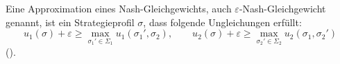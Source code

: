 Eine Approximation eines Nash-Gleichgewichts, auch $\varepsilon$-Nash-Gleichgewicht genannt, ist ein Strategieprofil $\sigma$, dass folgende Ungleichungen erfüllt:
\begin{equation}
u_1(\sigma) + \varepsilon \ge \max_{\sigma_1' \in \Sigma_1} u_1(\sigma_1', \sigma_2),
\qquad
u_2(\sigma) + \varepsilon \ge \max_{\sigma_2' \in \Sigma_2} u_2(\sigma_1, \sigma_2')
\end{equation}
(\cite[Eq.~2]{zinkevich2007regret}).
